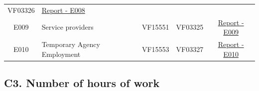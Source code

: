 \documentclass[]{book}
\begin{document}
\begin{longtable}[]{@{}clccc@{}}
\begin{minipage}[t]{0.19\columnwidth}
VF03326\strut
\end{minipage} & \begin{minipage}[t]{0.20\columnwidth}\centering
\href{./Auxiliary\%20Files/technical_reports/variable_report/E008.pdf}{Report - E008}\strut
\end{minipage}\tabularnewline
\begin{minipage}[t]{0.10\columnwidth}\centering
E009\strut
\end{minipage} & \begin{minipage}[t]{0.25\columnwidth}\raggedright
Service providers\strut
\end{minipage} & \begin{minipage}[t]{0.12\columnwidth}\centering
VF15551\strut
\end{minipage} & \begin{minipage}[t]{0.19\columnwidth}\centering
VF03325\strut
\end{minipage} & \begin{minipage}[t]{0.20\columnwidth}\centering
\href{./Auxiliary\%20Files/technical_reports/variable_report/E009.pdf}{Report - E009}\strut
\end{minipage}\tabularnewline
\begin{minipage}[t]{0.10\columnwidth}\centering
E010\strut
\end{minipage} & \begin{minipage}[t]{0.25\columnwidth}\raggedright
Temporary Agency Employment\strut
\end{minipage} & \begin{minipage}[t]{0.12\columnwidth}\centering
VF15553\strut
\end{minipage} & \begin{minipage}[t]{0.19\columnwidth}\centering
VF03327\strut
\end{minipage} & \begin{minipage}[t]{0.20\columnwidth}\centering
\href{./Auxiliary\%20Files/technical_reports/variable_report/E010.pdf}{Report - E010}\strut
\end{minipage}\tabularnewline
\bottomrule
\end{longtable}

\hypertarget{c3.-number-of-hours-of-work}{%
\subsection{C3. Number of hours of work}\label{c3.-number-of-hours-of-work}}
\end{document}
